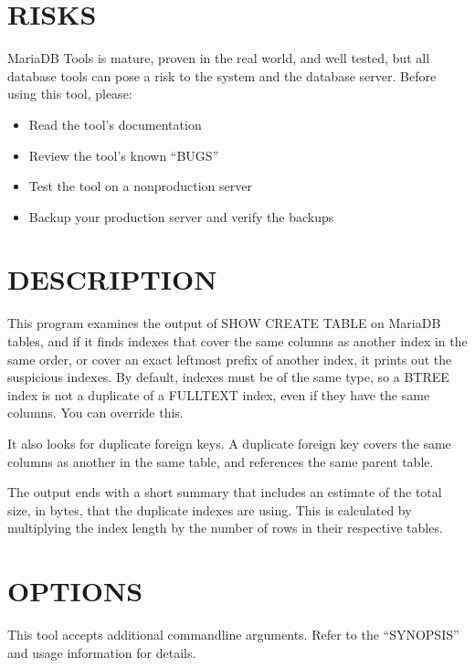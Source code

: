 \documentclass[letterpaper,10pt,english]{sphinxmanual}
\begin{document}
\section{RISKS}
\label{\detokenize{mariadb-index-checker:risks}}
\sphinxAtStartPar
MariaDB Tools is mature, proven in the real world, and well tested,
but all database tools can pose a risk to the system and the database
server.  Before using this tool, please:
\begin{itemize}
\item {} 
\sphinxAtStartPar
Read the tool’s documentation

\item {} 
\sphinxAtStartPar
Review the tool’s known “BUGS”

\item {} 
\sphinxAtStartPar
Test the tool on a non\sphinxhyphen{}production server

\item {} 
\sphinxAtStartPar
Backup your production server and verify the backups

\end{itemize}


\section{DESCRIPTION}
\label{\detokenize{mariadb-index-checker:description}}
\sphinxAtStartPar
This program examines the output of SHOW CREATE TABLE on MariaDB tables, and if
it finds indexes that cover the same columns as another index in the same
order, or cover an exact leftmost prefix of another index, it prints out
the suspicious indexes.  By default, indexes must be of the same type, so a
BTREE index is not a duplicate of a FULLTEXT index, even if they have the same
columns.  You can override this.

\sphinxAtStartPar
It also looks for duplicate foreign keys.  A duplicate foreign key covers the
same columns as another in the same table, and references the same parent
table.

\sphinxAtStartPar
The output ends with a short summary that includes an estimate of the total
size, in bytes, that the duplicate indexes are using. This is calculated by
multiplying the index length by the number of rows in their respective tables.


\section{OPTIONS}
\label{\detokenize{mariadb-index-checker:options}}
\sphinxAtStartPar
This tool accepts additional command\sphinxhyphen{}line arguments.  Refer to the
“SYNOPSIS” and usage information for details.
\end{document}
